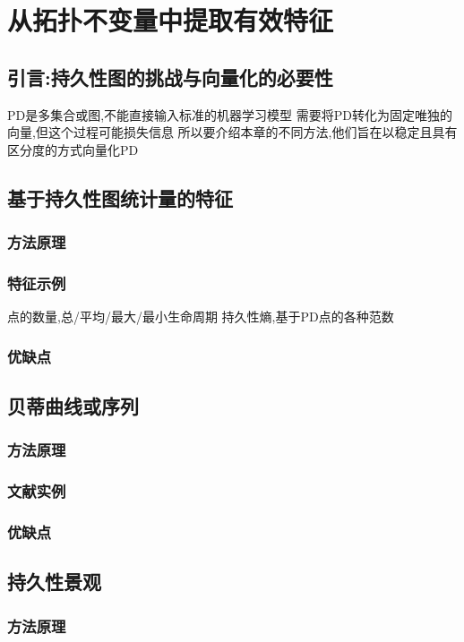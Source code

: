 \section{从拓扑不变量中提取有效特征}
\subsection{引言:持久性图的挑战与向量化的必要性}
PD是多集合或图,不能直接输入标准的机器学习模型
需要将PD转化为固定唯独的向量,但这个过程可能损失信息
所以要介绍本章的不同方法,他们旨在以稳定且具有区分度的方式向量化PD

\subsection{基于持久性图统计量的特征}
\subsubsection{方法原理}
\subsubsection{特征示例}
点的数量,总/平均/最大/最小生命周期
持久性熵,基于PD点的各种范数
\subsubsection{优缺点}

\subsection{贝蒂曲线或序列}
\subsubsection{方法原理}
\subsubsection{文献实例}
\subsubsection{优缺点}

\subsection{持久性景观}
\subsubsection{方法原理}
